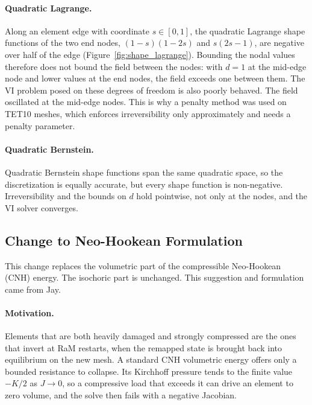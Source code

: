 \paragraph{Quadratic Lagrange.}
Along an element edge with coordinate $s\in[0,1]$, the quadratic Lagrange shape functions of the two end nodes, $(1-s)(1-2s)$ and $s(2s-1)$, are negative over half of the edge (Figure~\ref{fig:shape_lagrange}). Bounding the nodal values therefore does not bound the field between the nodes: with $d=1$ at the mid-edge node and lower values at the end nodes, the field exceeds one between them. The VI problem posed on these degrees of freedom is also poorly behaved. The field oscillated at the mid-edge nodes. This is why a penalty method was used on TET10 meshes, which enforces irreversibility only approximately and needs a penalty parameter.

\paragraph{Quadratic Bernstein.}
Quadratic Bernstein shape functions span the same quadratic space, so the discretization is equally accurate, but every shape function is non-negative. Irreversibility and the bounds on $d$ hold pointwise, not only at the nodes, and the VI solver converges. 


\subsection{Change to Neo-Hookean Formulation}\label{ss:cnh_change}

This change replaces the volumetric part of the compressible Neo-Hookean (CNH) energy. The isochoric part is unchanged. This suggestion and formulation came from Jay.

\paragraph{Motivation.}
Elements that are both heavily damaged and strongly compressed are the ones that invert at RaM restarts, when the remapped state is brought back into equilibrium on the new mesh. A standard CNH volumetric energy offers only a bounded resistance to collapse. Its Kirchhoff pressure tends to the finite value $-K/2$ as $J\to0$, so a compressive load that exceeds it can drive an element to zero volume, and the solve then fails with a negative Jacobian.

